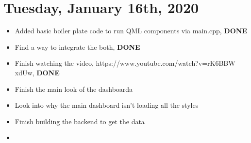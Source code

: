 \documentclass{article}
\begin{document}
    \section{Tuesday, January 16th, 2020}

        \begin{itemize}
            \item Added basic boiler plate code to run QML components via main.cpp, \textbf{DONE}
            \item Find a way to integrate the both, \textbf{DONE}
            \item Finish watching the video, https://www.youtube.com/watch?v=rK6BBW-xdUw, \textbf{DONE}
            \item Finish the main look of the dashboarda
            \item Look into why the main dashboard isn't loading all the styles
            \item Finish building the backend to get the data
            \item
        \end{itemize}
\end{document}
